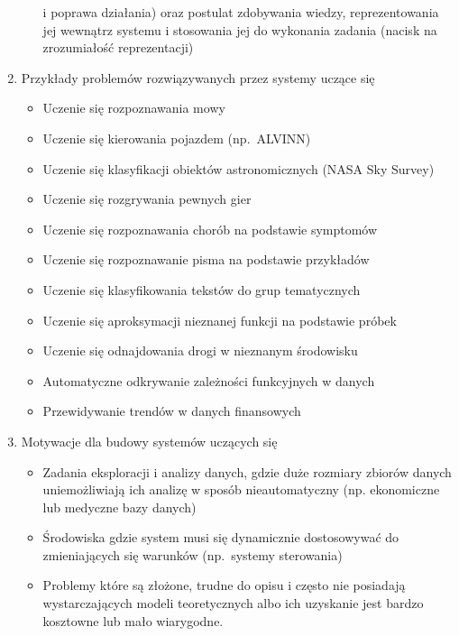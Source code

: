 \documentclass[11pt]{article}
\begin{document}
\begin{enumerate}
\begin{itemize}
            i poprawa działania) oraz postulat zdobywania wiedzy, reprezentowania jej wewnątrz systemu
            i stosowania jej do wykonania zadania (nacisk na zrozumiałość reprezentacji)
        \end{itemize}
        \item Przykłady problemów rozwiązywanych przez systemy uczące się \\
        \begin{itemize}
            \item Uczenie się rozpoznawania mowy
            \item Uczenie się kierowania pojazdem (np.\ ALVINN)
            \item Uczenie się klasyfikacji obiektów astronomicznych (NASA Sky Survey)
            \item Uczenie się rozgrywania pewnych gier
            \item Uczenie się rozpoznawania chorób na podstawie symptomów
            \item Uczenie się rozpoznawanie pisma na podstawie przykładów
            \item Uczenie się klasyfikowania tekstów do grup tematycznych
            \item Uczenie się aproksymacji nieznanej funkcji na podstawie próbek
            \item Uczenie się odnajdowania drogi w nieznanym środowisku
            \item Automatyczne odkrywanie zależności funkcyjnych w danych
            \item Przewidywanie trendów w danych finansowych
        \end{itemize}
        \clearpage
        \item Motywacje dla budowy systemów uczących się
        \begin{itemize}
            \item Zadania eksploracji i analizy danych, gdzie duże rozmiary zbiorów
            danych uniemożliwiają ich analizę w sposób nieautomatyczny (np.
            ekonomiczne lub medyczne bazy danych)
            \item Środowiska gdzie system musi się dynamicznie dostosowywać do
            zmieniających się warunków (np.\ systemy sterowania)
            \item Problemy które są złożone, trudne do opisu i często nie posiadają
            wystarczających modeli teoretycznych albo ich uzyskanie jest bardzo
            kosztowne lub mało wiarygodne.

\end{itemize}
\end{enumerate}
\end{document}
